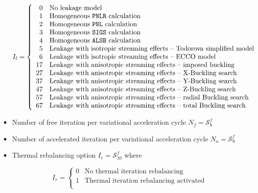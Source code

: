 \begin{itemize}
\begin{displaymath}
I_{l} = \left\{
\begin{array}{rl}
 0 & \textrm{No leakage model} \\
 1 & \textrm{Homogeneous \moc{PNLR} calculation} \\
 2 & \textrm{Homogeneous \moc{PNL} calculation} \\
 3 & \textrm{Homogeneous \moc{SIGS} calculation} \\
 4 & \textrm{Homogeneous \moc{ALSB} calculation} \\
 5 & \textrm{Leakage with isotropic streaming effects -- Todorova simplified model} \\
 6 & \textrm{Leakage with isotropic streaming effects -- ECCO model} \\
17 & \textrm{Leakage with anisotropic streaming effects -- imposed buckling} \\
27 & \textrm{Leakage with anisotropic streaming effects -- X-Buckling search} \\
37 & \textrm{Leakage with anisotropic streaming effects -- Y-Buckling search} \\
47 & \textrm{Leakage with anisotropic streaming effects -- Z-Buckling search} \\
57 & \textrm{Leakage with anisotropic streaming effects -- radial Buckling search} \\
67 & \textrm{Leakage with anisotropic streaming effects -- total Buckling search} \\
\end{array} \right.
\end{displaymath}

\item Number of free iteration per variational acceleration cycle $N_{f}=\mathcal{S}^{f}_{8}$
 
\item Number of accelerated iteration per variational acceleration cycle $N_{a}=\mathcal{S}^{f}_{9}$ 

\item Thermal rebalancing option $I_{r}=\mathcal{S}^{f}_{10}$ where

\begin{displaymath}
I_{r} = \left\{
\begin{array}{rl}
 0 & \textrm{No thermal iteration rebalancing} \\
 1 & \textrm{Thermal iteration rebalancing activated} \\
\end{array} \right.
\end{displaymath}


\end{itemize}
